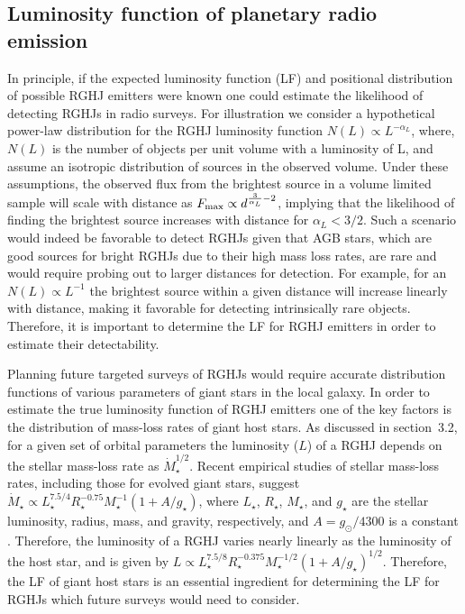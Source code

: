 \documentclass[iop,numberedappendix,apj]{emulateapj}
\begin{document}
\subsection{Luminosity function of planetary radio emission}
\label{ss:Lfunc}

In principle, if the expected luminosity function (LF) and positional distribution of possible RGHJ emitters were known one could estimate the likelihood of detecting RGHJs in radio surveys. For illustration we consider a hypothetical power-law distribution for the RGHJ luminosity function $N(L) \propto L^{-\alpha_L}$, where, $N(L)$ is the number of objects per unit volume with a luminosity of L, and assume an isotropic distribution of sources in the observed volume. Under these assumptions, the observed flux from the brightest source in a volume limited sample will scale with distance as $F_{\rm max} \propto d^{\frac{3}{\alpha_L} - 2}$, implying that the likelihood of finding the brightest source increases with distance for $\alpha_L < 3/2$. Such a scenario would indeed be favorable to detect RGHJs given that AGB stars, which are good sources for bright RGHJs due to their high mass loss rates, are rare and would require probing out to larger distances for detection. For example, for an $N(L) \propto L^{-1}$ the brightest source within a given distance will increase linearly with distance, making it favorable for detecting intrinsically rare objects. Therefore, it is important to determine the LF for RGHJ emitters in order to estimate their detectability. 

Planning future targeted surveys of RGHJs would require accurate distribution functions of various parameters of giant stars in the local galaxy. In order to estimate the true luminosity function of RGHJ emitters one of the key factors is the distribution of mass-loss rates of giant host stars. As discussed in section~3.2, for a given set of orbital parameters the luminosity ($L$) of a RGHJ depends on the stellar mass-loss rate as $\dot{M}_\star^{1/2}$. Recent empirical studies of stellar mass-loss rates, including those for evolved giant stars, suggest $\dot{M}_\star \propto L_\star^{7.5/4} R_\star^{-0.75} M_\star^{-1} (1+A/g_\star)$, where $L_\star$,  $R_\star$, $M_\star$, and $g_\star$ are the stellar luminosity, radius, mass, and gravity, respectively, and $A  = g_\odot/4300$ is a constant \citep{schroder2005,schroder2007}. 
Therefore, the luminosity of a RGHJ varies nearly linearly as the luminosity of the host star, and is given by $L \propto L_\star^{7.5/8} R_\star ^{-0.375} M_\star^{-1/2} (1+A/g_\star)^{1/2}$. Therefore, the LF of giant host stars is an essential ingredient for determining the LF for RGHJs which future surveys would need to consider. 
\end{document}
